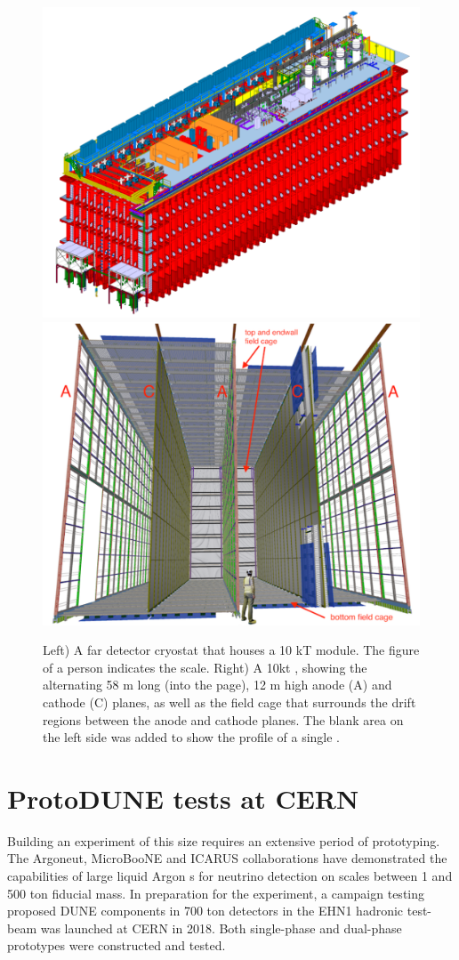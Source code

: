 \begin{figure}
\centering
\includegraphics[height=0.35\textwidth]{graphics/IntroFigures/Fig_03a_cryostat-scale.png}
\includegraphics[height=0.35\textwidth]{graphics/IntroFigures/Fig_03b_DUNESchematic.pdf}
\caption{Left) A far detector cryostat that houses a 10 kT  module. The figure of a person indicates the scale.  Right) A 10kt    , showing the alternating 58 m long (into the page), 12 m high anode (A) and cathode (C) planes, as well as the field cage that surrounds the drift regions between the anode and cathode planes. The blank area on the left side was added to show the profile of a single .}
\label{DUNESchematic}
\end{figure}

\section{ProtoDUNE tests at CERN}

Building an experiment of this size requires an extensive period of prototyping.   The Argoneut\cite{Acciarri:2018myr}, MicroBooNE\cite{microboone} and ICARUS\cite{icarus} collaborations have demonstrated the capabilities of large liquid Argon s for neutrino detection on scales between 1 and 500 ton fiducial mass.  In preparation for the  experiment, a campaign testing proposed DUNE components in 700 ton detectors in the EHN1 hadronic test-beam was launched at CERN in 2018.  Both single-phase and dual-phase prototypes were constructed and tested. %

